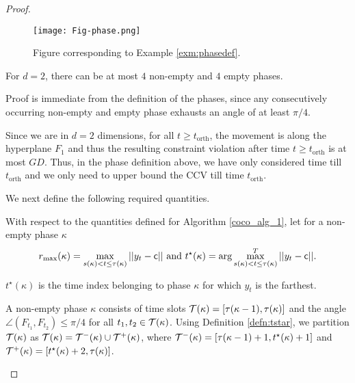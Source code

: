 \begin{proof}
\begin{figure}


\texttt{[image: Fig-phase.png]}
\caption{Figure corresponding to Example \ref{exm:phasedef}.}
\label{fig:phases}
\end{figure}



\begin{lemma}\label{lem:nrphases} For $d=2$, there can be at most $4$ non-empty and $4$ empty phases.  
\end{lemma}
Proof is immediate from the definition of the phases, since any consecutively occurring non-empty and empty phase exhausts an angle of at least $\pi/4$.

\begin{rem}\label{rem:aftertorth}
Since we are in $d=2$ dimensions, for all $t\ge t_{\text{orth}}$, the movement is along the hyperplane $F_1$ and thus the resulting constraint violation after time $t\ge t_{\text{orth}}$ is at most $GD$. Thus, in the phase definition above, we have only considered time till $t_{\text{orth}}$ and we only need to upper bound the CCV till time $t_{\text{orth}}$. \end{rem}





We next define the following required quantities.


\begin{definition}\label{defn:tstar}
With respect to the quantities defined for Algorithm \ref{coco_alg_1}, let for a non-empty phase $\kappa$ 
$$r_{\max}(\kappa)= \max_{s(\kappa) < t\le \tau(\kappa)} || y_t - {\mathsf{c}}||\ \text{and} \ t^\star(\kappa) = \arg \max_{s(\kappa) < t\le \tau(\kappa)}^T || y_t- {\mathsf{c}}||.$$
%
\end{definition}
$t^\star(\kappa)$ is the time index belonging to phase $\kappa$ for which $y_t$ is the farthest.

\begin{definition} 
A non-empty phase $\kappa$ consists of time slots $\mathcal{T}(\kappa) = [\tau(\kappa-1), \tau(\kappa)]$ and the angle $\angle(F_{t_1}, F_{t_2}) \le \pi/4$ for all $t_1,t_2\in \mathcal{T}(\kappa)$. Using Definition \ref{defn:tstar}, we partition $\mathcal{T}(\kappa)$ as $\mathcal{T}(\kappa) = \mathcal{T}^-(\kappa) \cup \mathcal{T}^+(\kappa)$, where $\mathcal{T}^-(\kappa) = [\tau(\kappa-1)+1, t^\star(\kappa)+1]$ and $\mathcal{T}^+(\kappa) = [ t^\star(\kappa)+2, \tau(\kappa)]$.
\end{definition}


\end{proof}
